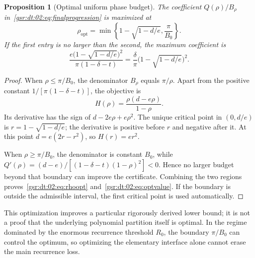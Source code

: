 \documentclass[11pt,letterpaper]{article}
\numberwithin{equation}{section}
\newtheorem{proposition}[theorem]{Proposition}
\theoremstyle{definition}
\theoremstyle{remark}
\newcommand{\1}{\mathbf 1}
\begin{document}
\begin{proposition}[Optimal uniform phase budget]\label{gsr:dt:02:prop:opt}
The coefficient $Q(\rho)/B_\rho$ in~\eqref{gsr:dt:02:eq:finalprogression} is maximized at
\begin{equation}\label{gsr:dt:02:eq:rhoopt}
 \boxed{\quad
 \rho_{\mathrm{opt}}=
 \min\left\{1-\sqrt{1-d/e},\frac\pi{B_0}\right\}.
 \quad}
\end{equation}
If the first entry is no larger than the second, the maximum coefficient is
\begin{equation}\label{gsr:dt:02:eq:optvalue}
 \frac{e\bigl(1-\sqrt{1-d/e}\bigr)^2}
      {\pi(1-\delta-t)}
 =\frac{\delta}{\pi}\bigl(1-\sqrt{1-d/e}\bigr)^2.
\end{equation}
\end{proposition}
\begin{proof}
When $\rho\leq\pi/B_0$, the denominator $B_\rho$ equals $\pi/\rho$. Apart from the positive constant $1/[\pi(1-\delta-t)]$, the objective is
\[
 H(\rho)=\frac{\rho(d-e\rho)}{1-\rho}.
\]
Its derivative has the sign of $d-2e\rho+e\rho^2$. The unique critical point in $(0,d/e)$ is $r=1-\sqrt{1-d/e}$; the derivative is positive before $r$ and negative after it. At this point $d=e(2r-r^2)$, so $H(r)=er^2$.

When $\rho\geq\pi/B_0$, the denominator is constant $B_0$, while $Q'(\rho)=(d-e)/[(1-\delta-t)(1-\rho)^2]<0$. Hence no larger budget beyond that boundary can improve the certificate. Combining the two regions proves~\eqref{gsr:dt:02:eq:rhoopt} and~\eqref{gsr:dt:02:eq:optvalue}. If the boundary is outside the admissible interval, the first critical point is used automatically.
\end{proof}

This optimization improves a particular rigorously derived lower bound; it is not a proof that the underlying polynomial partition itself is optimal. In the regime dominated by the enormous recurrence threshold $R_0$, the boundary $\pi/B_0$ can control the optimum, so optimizing the elementary interface alone cannot erase the main recurrence loss.
\end{document}
